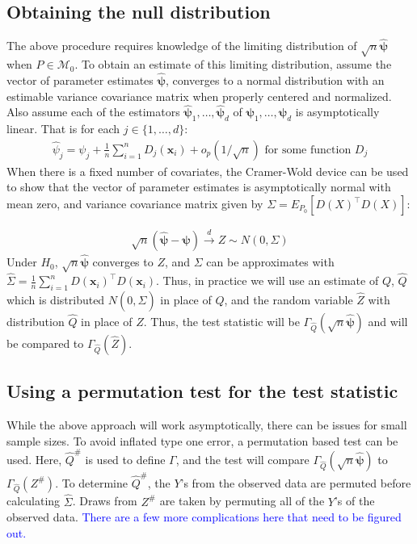 \documentclass{article}
\newcommand{\rvo}{X}
\newcommand{\disto}{P}
\newcommand{\rvv}{Z}
\newcommand{\distv}{Q}
\begin{document}
\subsection{Obtaining the null distribution}
\label{ssec:obtaining_null}
The above procedure requires knowledge of the limiting distribution of $\sqrt{n}\hat{\boldsymbol{\psi}}$ when $P \in \mathscr{M}_0$.  To obtain an estimate of this limiting distribution, assume the vector of parameter estimates $\hat{\boldsymbol{\psi}}$, converges to a normal distribution with an estimable variance covariance matrix when properly centered and normalized. Also assume each of the estimators $\hat{\boldsymbol{\psi}}_1, \dots, \hat{\boldsymbol{\psi}}_d$ of $\boldsymbol{\psi}_1, \dots, \boldsymbol{\psi}_d$ is asymptotically linear.  That is for each $j \in \{1, \dots, d\}$:
\begin{align*}
\hat{\psi}_j = \psi_j + \frac{1}{n}\sum_{i=1}^n D_j(\boldsymbol{x}_i) + o_p(1/\sqrt{n}) \text{ for some function } D_j
\end{align*}
When there is a fixed number of covariates, the Cramer-Wold device can be used to show that the vector of parameter estimates is asymptotically normal with mean zero, and variance covariance matrix given by $\Sigma = E_{\disto_0}\left[D(\rvo)^\top D(\rvo)\right]$:

\begin{align*}
    \sqrt{n}\left(\hat{\boldsymbol{\psi}} - \boldsymbol{\psi}\right) \xrightarrow{d} Z \sim N\left(0, \Sigma\right)
\end{align*}
Under $H_0$, $\sqrt{n}\hat{\boldsymbol{\psi}}$ converges to $Z$, and $\Sigma$ can be approximates with $\widehat{\Sigma} = \frac{1}{n}\sum_{i = 1}^n D(\boldsymbol{x}_i)^\top D(\boldsymbol{x}_i)$.  Thus, in practice we will use an estimate of $\distv$, $\hat{\distv}$ which is distributed $N(0, \widehat{\Sigma})$ in place of $\distv$, and the random variable $\hat{\rvv}$ with distribution $\hat{\distv}$ in place of $\rvv$.  Thus, the test statistic will be $\Gamma_{\hat{\distv}}(\sqrt{n} \hat{\boldsymbol{\psi}})$ and will be compared to $\Gamma_{\hat{\distv}}(\hat{\rvv})$.

\subsection{Using a permutation test for the test statistic}
While the above approach will work asymptotically, there can be issues for small sample sizes.  To avoid inflated type one error, a permutation based test can be used.  Here, $\hat{\distv}^\#$ is used to define $\Gamma$, and the test will compare $\Gamma_{\hat{\distv}}(\sqrt{n} \hat{\boldsymbol{\psi}})$ to $\Gamma_{\hat{\distv}}(\rvv^\#)$. To determine $\hat{\distv}^\#$, the $Y$'s from the observed data are permuted before calculating $\widehat \Sigma$.  Draws from $\rvv^\#$ are taken by permuting all of the $Y$'s of the observed data.  \textcolor{blue}{There are a few more complications here that need to be figured out.}
\end{document}
